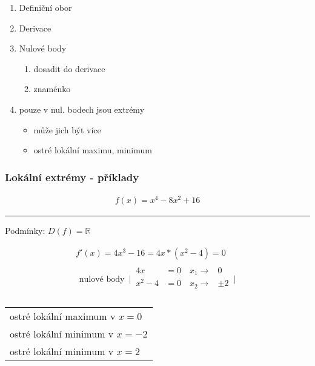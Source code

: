 \begin{enumerate}
  \item Definiční obor
  \item Derivace
  \item Nulové body
    \begin{enumerate}[label=(\alph*)]
      \item dosadit do derivace
      \item znaménko
    \end{enumerate}
  \item pouze v nul. bodech jsou extrémy
    \begin{itemize}
      \item může jich být více
      \item ostré lokální maximu, minimum
    \end{itemize}
\end{enumerate}
\subsubsection{Lokální extrémy - příklady}
\begin{align}
  f(x)=x^4-8x^2+16
\end{align}
\hrule
\begin{center}
  Podmínky: $D(f)=\mathbb{R}$
\end{center}
\begin{align*}
  f'(x)=4x^3-16=4x*(x^2-4)=0 \\
  \begin{alignedat}{2}
    \text{nulové body  }\,
    \Biggr|\,
    \begin{alignedat}{2}
      4x &=0 \quad x_1 \rightarrow &0 \\
      x^2-4 &=0 \quad x_2 \rightarrow &\pm2 \\
    \end{alignedat}
    \,\Biggr|
  \end{alignedat}
\end{align*}
\begin{center}
  \begin{tabular}{l}
    ostré lokální maximum v $x=0$\\
    ostré lokální minimum v $x=-2$\\
    ostré lokální minimum v $x=2$
  \end{tabular}
\end{center}
\begin{center}
\end{center}

